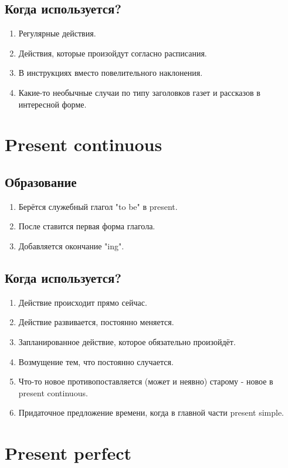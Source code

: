 \documentclass[oneside]{book}
\begin{document}
	\subsection{Когда используется?}
	\begin{enumerate}
		\item Регулярные действия.
		\item Действия, которые произойдут согласно расписания.
		\item В инструкциях вместо повелительного наклонения.
		\item Какие-то необычные случаи по типу заголовков газет и рассказов в интересной форме.
	\end{enumerate}

	\section{Present continuous}
	\subsection{Образование}
	\begin{enumerate}
		\item Берётся служебный глагол "to be" в present.
		\item После ставится первая форма глагола.
		\item Добавляется окончание "ing".
	\end{enumerate}

	\subsection{Когда используется?}
	\begin{enumerate}
		\item Действие происходит прямо сейчас.
		\item Действие развивается, постоянно меняется.
		\item Запланированное действие, которое обязательно произойдёт.
		\item Возмущение тем, что постоянно случается.
		\item Что-то новое противопоставляется (может и неявно) старому - новое в present continuous.
		\item Придаточное предложение времени, когда в главной части present simple.
	\end{enumerate}

	\section{Present perfect}
\end{document}
